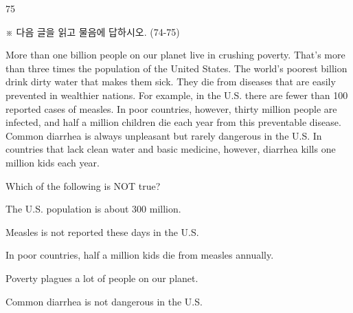 \begin{question}{75}
\begin{framedtext}
※ 다음 글을 읽고 물음에 답하시오. (74-75) \par
More than one billion people on our planet live in crushing poverty. That's more than three times the population of the United States. The world's poorest billion drink dirty water that makes them sick. They die from diseases that are easily prevented in wealthier nations. For example, in the U.S. there are fewer than 100 reported cases of measles. In poor countries, however, thirty million people are infected, and half a million children die each year from this preventable disease. Common diarrhea is always unpleasant but rarely dangerous in the U.S. In countries that lack clean water and basic medicine, however, diarrhea kills one million kids each year. \par
\end{framedtext}
Which of the following is NOT true?
\begin{choices}
  \item The U.S. population is about 300 million.
  \item Measles is not reported these days in the U.S.
  \item In poor countries, half a million kids die from measles annually.
  \item Poverty plagues a lot of people on our planet.
  \item Common diarrhea is not dangerous in the U.S.
\end{choices}
\end{question}
